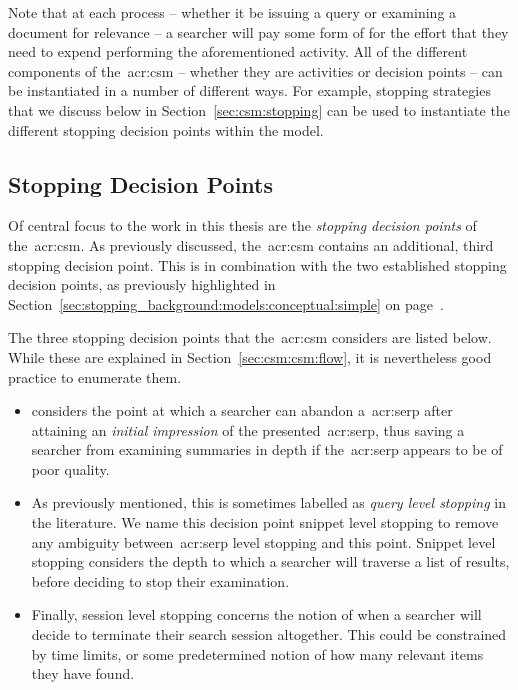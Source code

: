 Note that at each process -- whether it be issuing a query or examining a document for relevance -- a searcher will pay some form of  for the effort that they need to expend performing the aforementioned activity. All of the different components of the~\gls{acr:csm} -- whether they are activities or decision points -- can be instantiated in a number of different ways. For example, stopping strategies that we discuss below in Section~\ref{sec:csm:stopping} can be used to instantiate the different stopping decision points within the model. 

\subsection{Stopping Decision Points}\label{sec:csm:csm:stopping}
Of central focus to the work in this thesis are the \emph{stopping decision points} of the~\gls{acr:csm}. As previously discussed, the~\gls{acr:csm} contains an additional, third stopping decision point. This is in combination with the two established stopping decision points, as previously highlighted in Section~\ref{sec:stopping_background:models:conceptual:simple} on page~\pageref{sec:stopping_background:models:conceptual:simple}.

The three stopping decision points that the~\gls{acr:csm} considers are listed below. While these are explained in Section~\ref{sec:csm:csm:flow}, it is nevertheless good practice to enumerate them.

\begin{itemize}
    
    \item{ considers the point at which a searcher can abandon a~\gls{acr:serp} after attaining an \emph{initial impression} of the presented~\gls{acr:serp}, thus saving a searcher from examining summaries in depth if the~\gls{acr:serp} appears to be of poor quality.}
    
    \item{ As previously mentioned, this is sometimes labelled as \emph{query level stopping} in the literature. We name this decision point snippet level stopping to remove any ambiguity between~\gls{acr:serp} level stopping and this point. Snippet level stopping considers the depth to which a searcher will traverse a list of results, before deciding to stop their examination.}
    
    \item{ Finally, session level stopping concerns the notion of when a searcher will decide to terminate their search session altogether. This could be constrained by time limits, or some predetermined notion of how many relevant items they have found.}
    
\end{itemize}

